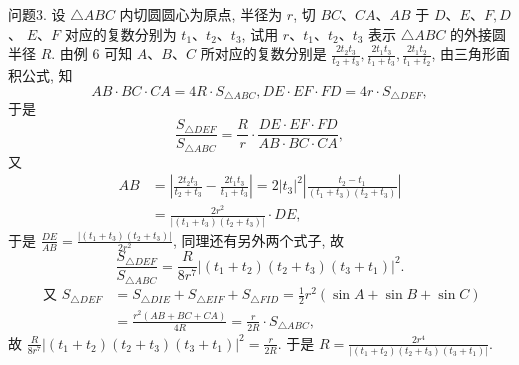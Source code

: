 问题3. 设 $\triangle A B C$ 内切圆圆心为原点, 半径为 $r$, 切 $B C 、 C A 、 A B$ 于 $D 、 E 、 F, D$ 、 $E 、 F$ 对应的复数分别为 $t_1 、 t_2 、 t_3$, 试用 $r 、 t_1 、 t_2 、 t_3$ 表示 $\triangle A B C$ 的外接圆半径 $R$.
由例 6 可知 $A 、 B 、 C$ 所对应的复数分别是 $\frac{2 t_2 t_3}{t_2+t_3}, \frac{2 t_1 t_3}{t_1+t_3}, \frac{2 t_1 t_2}{t_1+t_2}$, 由三角形面积公式, 知
$$
A B \cdot B C \cdot C A=4 R \cdot S_{\triangle A B C}, D E \cdot E F \cdot F D=4 r \cdot S_{\triangle D E F},
$$
于是
$$
\frac{S_{\triangle D E F}}{S_{\triangle A B C}}=\frac{R}{r} \cdot \frac{D E \cdot E F \cdot F D}{A B \cdot B C \cdot C A},
$$
又
$$
\begin{aligned}
A B & =\left|\frac{2 t_2 t_3}{t_2+t_3}-\frac{2 t_1 t_3}{t_1+t_3}\right|=2\left|t_3\right|^2\left|\frac{t_2-t_1}{\left(t_1+t_3\right)\left(t_2+t_3\right)}\right| \\
& =\frac{2 r^2}{\left|\left(t_1+t_3\right)\left(t_2+t_3\right)\right|} \cdot D E,
\end{aligned}
$$
于是 $\frac{D E}{A B}=\frac{\left|\left(t_1+t_3\right)\left(t_2+t_3\right)\right|}{2 r^2}$, 同理还有另外两个式子, 故
$$
\frac{S_{\triangle D E F}}{S_{\triangle A B C}}=\frac{R}{8 r^7}\left|\left(t_1+t_2\right)\left(t_2+t_3\right)\left(t_3+t_1\right)\right|^2 .
$$
$$
\begin{aligned}
\text { 又 } S_{\triangle D E F} & =S_{\triangle D I E}+S_{\triangle E I F}+S_{\triangle F I D}=\frac{1}{2} r^2(\sin A+\sin B+\sin C) \\
& =\frac{r^2(A B+B C+C A)}{4 R}=\frac{r}{2 R} \cdot S_{\triangle A B C},
\end{aligned}
$$
故 $\frac{R}{8 r^7}\left|\left(t_1+t_2\right)\left(t_2+t_3\right)\left(t_3+t_1\right)\right|^2=\frac{r}{2 R}$. 于是 $R=\frac{2 r^4}{\left|\left(t_1+t_2\right)\left(t_2+t_3\right)\left(t_3+t_1\right)\right|}$.



